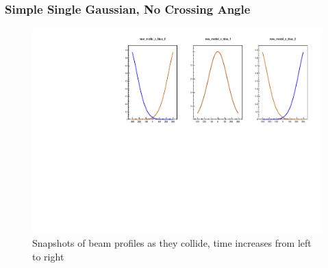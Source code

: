 \begin{frame}
\frametitle{Simple Single Gaussian, No Crossing Angle}
\begin{figure}
\begin{center}
\includegraphics[width=\linewidth]{../OverlapTest/figs/359711_model3_noangle_zprofile.pdf}
\end{center}
\caption{Snapshots of beam profiles as they collide, time increases from left to right }
\label{fig:359711_model3_noangle_zprofile}
\end{figure}
\end{frame}


